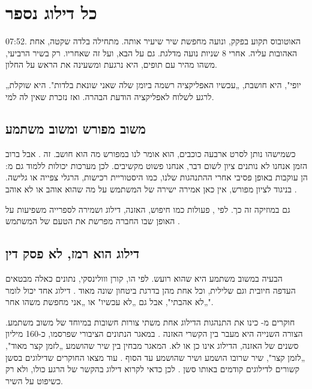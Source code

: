 
\chapter{כל דילוג נספר}\label{ch:2}

\begin{scene}
07:52. האוטובוס תקוע בפקק, ונועה מחפשת שיר שיעיר אותה. מתחילה בלדה שקטה, אחת האהובות עליה. אחרי 8 שניות נועה מדלגת. גם על הבא, ועל זה שאחריו. רק בשיר הרביעי, משהו מהיר עם תופים, היא נרגעת ומשעינה את הראש על החלון.

„יופי", היא חושבת, „עכשיו האפליקציה רשמה ביומן שלה שאני שונאת בלדות". היא שוקלת לרגע לשלוח לאפליקציה הודעת הבהרה. ואז נזכרת שאין לה למי.
\end{scene}

\section{משוב מפורש ומשוב משתמע}

כשמישהו נותן לסרט ארבעה כוכבים, הוא אומר לנו במפורש מה הוא חושב. זה . אבל ברוב הזמן אנחנו לא נותנים ציון לשום דבר, אנחנו פשוט מקשיבים. לכן מערכות יכולות ללמוד גם מ: הן עוקבות באופן פסיבי אחרי ההתנהגות שלנו, כמו היסטוריית רכישות, הרגלי צפייה או גלישה. בניגוד לציון מפורש, אין כאן אמירה ישירה של המשתמש על מה שהוא אוהב או לא אוהב \cite{hu2008collaborative}.

גם במוזיקה זה כך. לפי , פעולות כמו חיפוש, האזנה, דילוג ושמירה לספרייה משפיעות על האופן שבו החברה מפרשת את הטעם של המשתמש \cite{spotify2026understanding}.

\section{דילוג הוא רמז, לא פסק דין}

הבעיה במשוב משתמע היא שהוא רועש. לפי הו, קורן ווולינסקי, נתונים כאלה מבטאים העדפה חיובית וגם שלילית, וכל אחת מהן בדרגת ביטחון שונה מאוד \cite{hu2008collaborative}. דילוג אחד יכול לומר „לא אהבתי", אבל גם „לא עכשיו" או „אני מחפשת משהו אחר".

חוקרים מ- כינו את התנהגות הדילוג אחת משתי צורות חשובות במיוחד של משוב משתמע. הצורה השנייה היא מעבר בין הקשרי האזנה \cite{brost2019music}. במאגר הנתונים הציבורי שפרסמו, כ-160 מיליון סשנים של האזנה, הדילוג אינו כן או לא. המאגר מבחין בין שיר שהושמע „לזמן קצר מאוד", „לזמן קצר", שיר שרובו הושמע ושיר שהושמע עד הסוף \cite{brost2019music}. עוד מצאו החוקרים שדילוגים בסשן קשורים לדילוגים קודמים באותו סשן \cite{brost2019music}. לכן כדאי לקרוא דילוג בהקשר של הרגע כולו, ולא רק כשיפוט על השיר.

